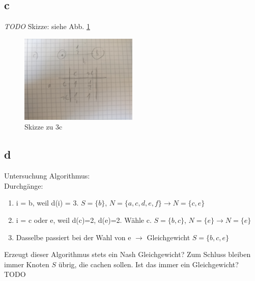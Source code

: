 \documentclass[10pt]{article}%
\theoremstyle{nonumberplain}
\begin{document}
\subsection{c}
\emph{TODO}
Skizze: siehe Abb. \ref{skz3c}
\begin{figure}
	\centering
	\includegraphics[width=0.5\textwidth]{img/Skizze3c.jpg}
	\caption{Skizze zu 3c}
	\label{skz3c}
\end{figure}

\subsection{d}
Untersuchung Algorithmus:\\
Durchgänge:
\begin{enumerate}
	\item i = b, weil d(i) = 3. $S=\{b\}$, $N=\{a,c,d,e,f\} \rightarrow N=\{c, e\}$
	\item i = c oder e, weil d(c)=2, d(e)=2. Wähle c. $S=\{b, c\}$, $N=\{e\} \rightarrow N=\{e\}$
	\item Dasselbe passiert bei der Wahl von e $\rightarrow$ Gleichgewicht $S=\{b, c, e\}$
\end{enumerate}
Erzeugt dieser Algorithmus stets ein Nash Gleichgewicht?
Zum Schluss bleiben immer Knoten $S$ übrig, die cachen sollen.
Ist das immer ein Gleichgewicht?
TODO
\end{document}
